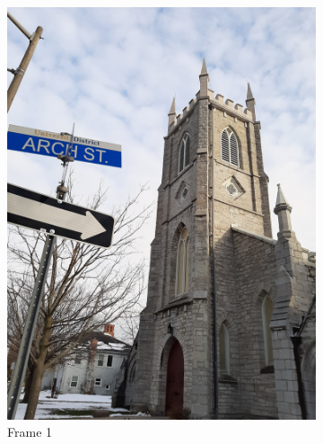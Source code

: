 \documentclass[conference]{IEEEtran}
\begin{document}
\begin{figure}[!h]
  \centering
  \begin{subfigure}[b]{0.2\linewidth}
    \includegraphics[width=\linewidth, angle = -90]{images/frame1.jpg}
     \caption{Frame 1}
  \end{subfigure}
  \begin{subfigure}[b]{0.2\linewidth}

\end{subfigure}
\end{figure}
\end{document}
